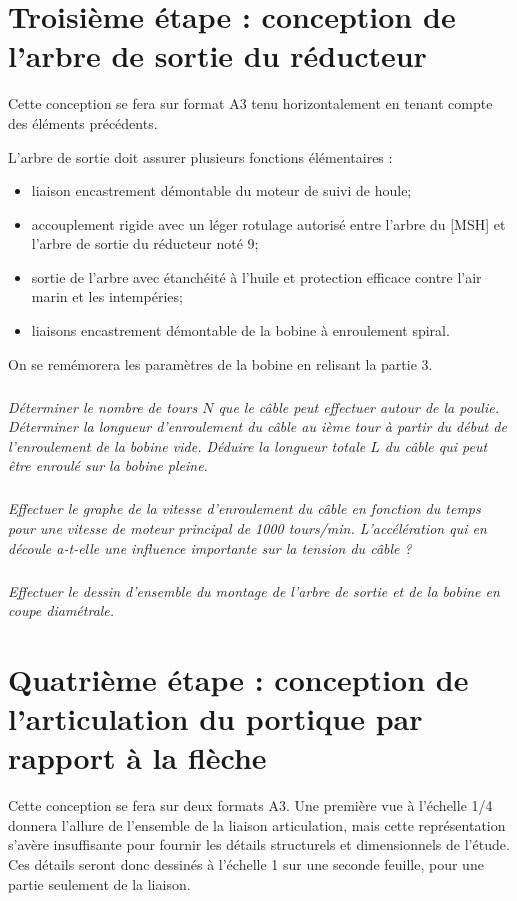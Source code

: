 \documentclass[10pt]{article}
\begin{document}
\section{Troisième étape : conception de l'arbre de sortie du réducteur}

Cette conception se fera sur format A3 tenu horizontalement en tenant compte des éléments précédents.

L'arbre de sortie doit assurer plusieurs fonctions élémentaires :
\begin{itemize}
\item liaison encastrement démontable du moteur de suivi de houle;
\item accouplement rigide avec un léger rotulage autorisé entre l'arbre du [MSH] et l'arbre de sortie du réducteur noté 9;
\item sortie de l'arbre avec étanchéité à l'huile et protection efficace contre l'air marin et les intempéries;
\item liaisons encastrement démontable de la bobine à enroulement spiral.
\end{itemize}


On se remémorera les paramètres de la bobine en relisant la partie 3.

\subparagraph{}
\textit{Déterminer le nombre de tours $N$ que le câble peut effectuer autour de la poulie. 
Déterminer la longueur d'enroulement du câble au ième tour à partir du début de l'enroulement de la bobine vide.
Déduire la longueur totale $L$ du câble qui peut être enroulé sur la bobine pleine.}

\subparagraph{}
\textit{Effectuer le graphe de la vitesse d'enroulement du câble en fonction du temps pour une vitesse de moteur principal de 1000 tours/min.
L'accélération qui en découle a-t-elle une influence importante sur la tension du câble ?}

\subparagraph{}
\textit{Effectuer le dessin d'ensemble du montage de l'arbre de sortie et de la bobine en coupe diamétrale.}


\section{Quatrième étape :  conception de l'articulation du portique par rapport à la flèche}

Cette conception se fera sur deux formats A3. Une première vue à l'échelle 1/4 donnera l'allure de l'ensemble de la liaison articulation, mais cette représentation s'avère insuffisante pour fournir les détails structurels et dimensionnels de l'étude. Ces détails seront donc dessinés à l'échelle 1 sur une seconde feuille, pour une partie seulement de la liaison. 
\end{document}
